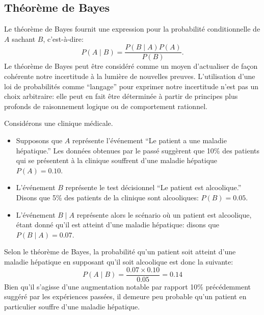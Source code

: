 \subsection{Théorème de Bayes} %
Le théorème de Bayes fournit une expression pour la probabilité conditionnelle de $A$ sachant $B$, c'est-à-dire:
	$$P(A\mid B) = \frac{P(B\mid A) P(A)}{P(B)}.$$
Le théorème de Bayes peut être considéré comme un moyen d'actualiser de façon cohérente notre incertitude à la lumière de nouvelles preuves. L'utilisation d'une loi de probabilités comme ``langage'' pour exprimer notre incertitude n'est pas un choix arbitraire: elle peut en fait être déterminée à partir de principes plus profonds de raisonnement logique ou de comportement rationnel.
\begin{Exemple} Consid\'erons une clinique m\'edicale. 
\begin{itemize}[noitemsep]
	\item Supposons que $A$  représente l'événement ``Le patient a une maladie hépatique.'' Les données obtenues par le pass\'e suggèrent que 10\% des patients qui se présentent à la clinique souffrent d'une maladie hépatique  $P(A) = 0.10$.
	\item L'événement $B$ représente le  test décisionnel ``Le patient est alcoolique.'' Disons que 5\% des patients de la clinique sont alcooliques:  $P(B) = 0.05$.
	\item L'événement $B\mid A$ représente alors le scénario o\`u un patient est alcoolique, étant donné qu'il est atteint d'une maladie hépatique: disons que $P(B\mid A) = 0.07$.
\end{itemize}
 Selon le théorème de Bayes, la probabilité qu'un patient soit atteint d'une maladie hépatique en supposant qu'il soit alcoolique est donc la suivante: $$P(A\mid B) = \frac{0.07 \times 0.10}{0.05} = 0.14$$ 
Bien qu'il s'agisse d'une augmentation notable par rapport  10\% précédemment suggéré par les expériences passées, il demeure peu probable qu'un patient en particulier souffre d'une maladie hépatique.
\end{Exemple}
